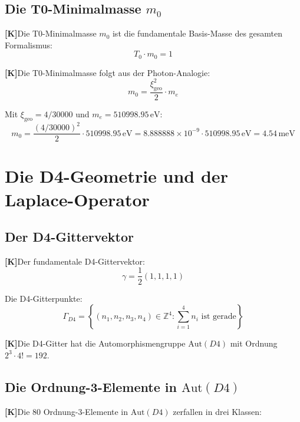 \documentclass[11pt,a4paper]{article}
\newcommand{\xigeo}{\xi_{\text{geo}}}
\newcommand{\Kstatus}{\textbf{[K]}}
\begin{document}
	\subsection{Die T0-Minimalmasse $m_0$}
	
	\Kstatus Die T0-Minimalmasse $m_0$ ist die fundamentale Basis-Masse des gesamten Formalismus:
	\begin{equation}
		T_0 \cdot m_0 = 1
	\end{equation}
	
	\Kstatus Die T0-Minimalmasse folgt aus der Photon-Analogie:
	\begin{equation}
		m_0 = \frac{\xigeo^2}{2} \cdot m_e
	\end{equation}
	
	Mit $\xigeo = 4/30000$ und $m_e = 510998.95\,\text{eV}$:
	\begin{equation}
		m_0 = \frac{(4/30000)^2}{2} \cdot 510998.95\,\text{eV}
		= 8.888888 \times 10^{-9} \cdot 510998.95\,\text{eV}
		= 4.54\,\text{meV}
	\end{equation}
	
	\section{Die D4-Geometrie und der Laplace-Operator}
	
	\subsection{Der D4-Gittervektor}
	
	\Kstatus Der fundamentale D4-Gittervektor:
	\begin{equation}
		\gamma = \frac{1}{2}(1, 1, 1, 1)
	\end{equation}
	
	Die D4-Gitterpunkte:
	\begin{equation}
		\Gamma_{D4} = \left\{ (n_1, n_2, n_3, n_4) \in \mathbb{Z}^4 : \sum_{i=1}^4 n_i \text{ ist gerade} \right\}
	\end{equation}
	
	\Kstatus Die D4-Gitter hat die Automorphismengruppe $\text{Aut}(D4)$ mit Ordnung $2^3 \cdot 4! = 192$.
	
	\subsection{Die Ordnung-3-Elemente in $\text{Aut}(D4)$}
	
	\Kstatus Die 80 Ordnung-3-Elemente in $\text{Aut}(D4)$ zerfallen in drei Klassen:
	
\end{document}

